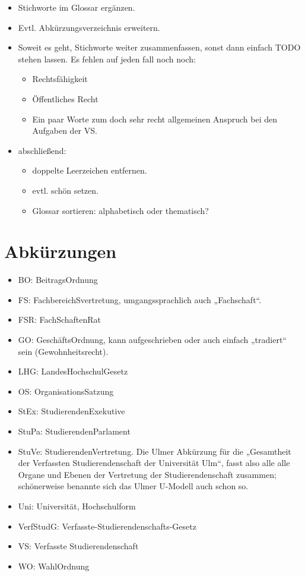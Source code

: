 \documentclass[
10pt,
a4paper,
twoside,								%
titlepage=false,							%
draft=false								%
]{scrartcl}
\begin{document}
\begin{itemize}
	\item Stichworte im Glossar ergänzen.
	\item Evtl. Abkürzungsverzeichnis erweitern.
	\item Soweit es geht, Stichworte weiter zusammenfassen, sonst dann einfach TODO stehen lassen. Es fehlen auf jeden fall noch noch:
	\begin{itemize}
		\item Rechtsfähigkeit
		\item Öffentliches Recht
		\item Ein paar Worte zum doch sehr recht allgemeinen Anspruch bei den Aufgaben der VS.
	\end{itemize}
	\item abschließend:
	\begin{itemize}
		\item doppelte Leerzeichen entfernen.
		\item evtl. schön setzen.
		\item Glossar sortieren: alphabetisch oder thematisch?
	\end{itemize}
\end{itemize}



\section*{Abkürzungen}


\begin{itemize}
\item BO: BeitragsOrdnung
\item FS: FachbereichSvertretung, umgangssprachlich auch „Fachschaft“.
\item FSR: FachSchaftenRat
\item GO: GeschäftsOrdnung, kann aufgeschrieben oder auch einfach „tradiert“ sein (Gewohnheitsrecht).
\item LHG: LandesHochschulGesetz
\item OS: OrganisationsSatzung
\item StEx: StudierendenExekutive
\item StuPa: StudierendenParlament
\item StuVe: StudierendenVertretung. Die Ulmer Abkürzung für die „Gesamtheit der Verfassten Studierendenschaft der Universität Ulm“, fasst also alle alle Organe und Ebenen der Vertretung der Studierendenschaft zusammen; schönerweise benannte sich das Ulmer U-Modell auch schon so.
\item Uni: Universität, Hochschulform
\item VerfStudG: Verfasste-Studierendenschafts-Gesetz
\item VS: Verfasste Studierendenschaft
\item WO: WahlOrdnung
\end{itemize}
\end{document}
